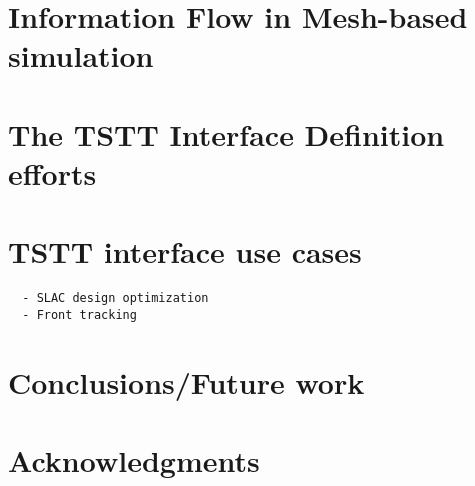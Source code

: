 \documentclass[11pt]{article}
\begin{document}
\section{Information Flow in Mesh-based simulation}



\section{The TSTT Interface Definition efforts}



\section{TSTT interface use cases}




\begin{verbatim}
  - SLAC design optimization 
  - Front tracking
\end{verbatim}

\section{Conclusions/Future work}


\section*{Acknowledgments} 



\end{document}
